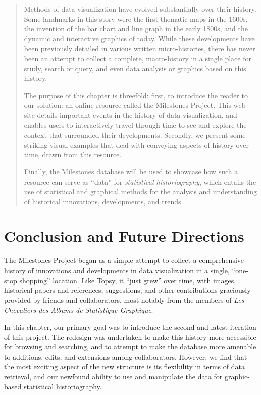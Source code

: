 \documentclass[11pt]{article}
\begin{document}
\begin{abstract}
Methods of data visualization have evolved substantially over their history.
Some landmarks in this story were the first thematic maps in the 1600s, the invention of the bar chart and line graph in the early 1800s,
and the dynamic and interactive graphics of today.  
While these developments have been previously detailed in various written micro-histories, 
there has never been an attempt to collect a complete, macro-history in a single place for study, search or query, and even data analysis or graphics based on this history.

The purpose of this chapter is threefold: first, to introduce the reader to our solution: an online resource called the Milestones Project. 
This web site details  important events in the history of data visualization, and enables users to interactively travel through time to see and explore the context that surrounded their developments. 
Secondly, we present some striking visual examples that deal with conveying aspects of history over time, drawn from this resource.

Finally, the Milestones database will be used to showcase how such a resource can serve as ``data'' for \emph{statistical historiography}, which entails the use of statistical and graphical methods for the analysis and understanding of historical innovations, developments, and trends.
\end{abstract}


\section{Conclusion and Future Directions}
The Milestones Project began as a simple attempt to collect a comprehensive history of innovations and developments in data visualization in a single, ``one-stop shopping'' location.
Like Topsy, it ``just grew'' over time, with images, historical papers and references, suggestions, and other contributions graciously provided by friends and collaborators, most notably from the members of \emph{Les Chevaliers des Albums de Statistique Graphique}.

In this chapter, our primary goal was to introduce the second and latest iteration of this project.
The redesign was undertaken to make this history more accessible for browsing and searching, and to attempt to make the database 
more amenable to additions, edits, and extensions among collaborators.  
However, we find that the most exciting aspect of the new structure is its flexibility in terms of data retrieval, 
and our newfound ability to use and manipulate the data for graphic-based statistical historiography.
\end{document}
